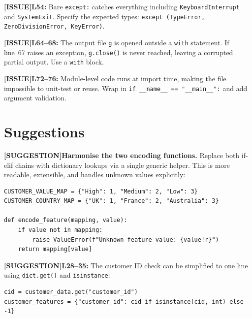 \documentclass{article}
\newcommand{\lineno}[1]{\textbf{L#1:} }
\newcommand{\linesno}[2]{\textbf{L#1--#2:} }
\newcommand{\issue}{\textcolor{orange!80!black}{\textbf{[ISSUE]}}\space}
\newcommand{\suggestion}{\textcolor{suggblue}{\textbf{[SUGGESTION]}}\space}
\begin{document}
\begin{issuebox}
\issue \lineno{54} Bare \texttt{except:} catches everything including \texttt{KeyboardInterrupt} and \texttt{SystemExit}. Specify the expected types: \texttt{except (TypeError, ZeroDivisionError, KeyError)}.
\end{issuebox}

\begin{issuebox}
\issue \linesno{64}{68} The output file \texttt{g} is opened outside a \texttt{with} statement. If line~67 raises an exception, \texttt{g.close()} is never reached, leaving a corrupted partial output. Use a \texttt{with} block.
\end{issuebox}

\begin{issuebox}
\issue \linesno{72}{76} Module-level code runs at import time, making the file impossible to unit-test or reuse. Wrap in \texttt{if \_\_name\_\_ == "\_\_main\_\_":} and add argument validation.
\end{issuebox}

\section{Suggestions}

\begin{suggbox}
\suggestion \textbf{Harmonise the two encoding functions.} Replace both if-elif chains with dictionary lookups via a single generic helper. This is more readable, extensible, and handles unknown values explicitly:
\begin{lstlisting}[numbers=none]
CUSTOMER_VALUE_MAP = {"High": 1, "Medium": 2, "Low": 3}
CUSTOMER_COUNTRY_MAP = {"UK": 1, "France": 2, "Australia": 3}

def encode_feature(mapping, value):
    if value not in mapping:
        raise ValueError(f"Unknown feature value: {value!r}")
    return mapping[value]
\end{lstlisting}
\end{suggbox}

\begin{suggbox}
\suggestion \lineno{28--35} The customer ID check can be simplified to one line using \texttt{dict.get()} and \texttt{isinstance}:
\begin{lstlisting}[numbers=none]
cid = customer_data.get("customer_id")
customer_features = {"customer_id": cid if isinstance(cid, int) else -1}
\end{lstlisting}
\end{suggbox}
\end{document}
